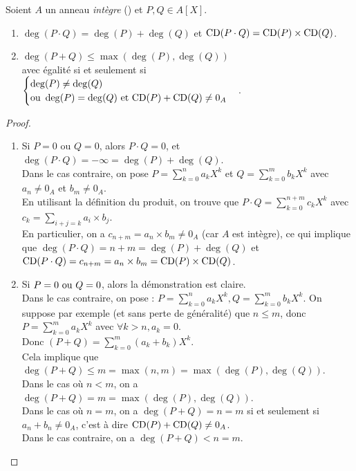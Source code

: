 \documentclass[12pt,a4paper]{report}
\begin{document}
\begin{property}
    Soient $A$ un anneau \textit{intègre} () et $P,Q \in A[X]$.

    \begin{enumerate}
        \item $\deg(P\cdot Q) = \deg(P) + \deg(Q)$ et $\mathrm{CD}(P\cdot Q) = \mathrm{CD}(P) \times \mathrm{CD}(Q)$.
        \item $\deg(P+Q) \le \max(\deg(P), \deg(Q))$\\avec égalité si et seulement si $\begin{cases} \deg(P) \ne \deg(Q)\\ \text{ou } \deg(P) = \deg(Q) \text{ et } \mathrm{CD}(P) + \mathrm{CD}(Q) \ne 0_A\end{cases}$.
    \end{enumerate}
\end{property}

\begin{proof}
    \begin{enumerate}
        \item Si $P=0$ ou $Q=0$, alors $P\cdot Q = 0$, et $\deg(P\cdot Q) = -\infty = \deg(P) + \deg(Q)$.\\Dans le cas contraire, on pose $P = \sum_{k=0}^{n}a_k X^k$ et $Q = \sum_{k=0}^{m}b_k X^k$ avec $a_n \ne 0_A$ et $b_m \ne 0_A$.\\En utilisant la définition du produit, on trouve que $P\cdot Q = \sum_{k=0}^{n+m}c_k X^k$ avec $c_{k} = \sum_{i+j=k} a_i \times b_j$.\\En particulier, on a $c_{n+m} = a_n \times b_m \ne 0_A$ (car $A$ est intègre), ce qui implique que $\deg(P\cdot Q) = n+m = \deg(P) + \deg(Q)$ et $\mathrm{CD}(P\cdot Q) = c_{n+m} = a_n \times b_m = \mathrm{CD}(P) \times \mathrm{CD}(Q)$.
        \item Si $P = 0 \text{ ou } Q= 0$, alors la démonstration est claire.\\Dans le cas contraire, on pose : $P=\sum_{k=0}^{n}a_kX^k, Q = \sum_{k=0}^{m}b_kX^k$. On suppose par exemple (et sans perte de généralité) que $n \le m$, donc $P = \sum_{k=0}^{m}a_kX^k$ avec $\forall k > n, a_k = 0$.\\Donc $(P+Q) = \sum_{k=0}^{m}(a_k+b_k)X^k$.\\Cela implique que $\deg(P+Q) \le m = \max(n,m) = \max(\deg(P), \deg(Q))$.\\Dans le cas où $n < m$, on a $\deg(P+Q) = m = \max(\deg(P), \deg(Q))$.\\Dans le cas où $n = m$, on a $\deg(P+Q) = n = m$ si et seulement si $a_n + b_n \ne 0_A$, c'est à dire $\mathrm{CD}(P) + \mathrm{CD}(Q) \ne 0_A$.\\Dans le cas contraire, on a $\deg(P+Q) < n = m$.
    \end{enumerate}
\end{proof}
\end{document}

